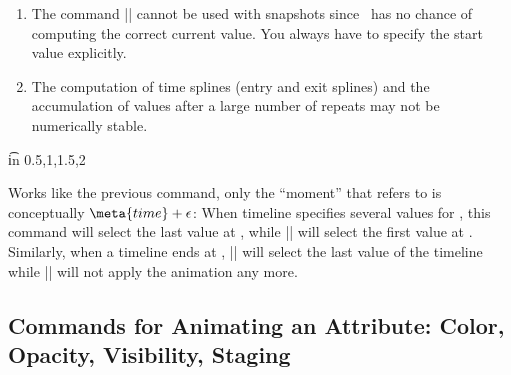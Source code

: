 \begin{command}{\pgfsysanimsnapshot{}}
\begin{enumerate}
            However, there is one command which helps you with ``simulating''
            the effect of events:
            \begin{command}{\pgfsysanimkeysnapshotstart{}}
                This command specifies that for the current animation the
                ``moment |0s|'' of the timeline is at . Thus,
                it works like |\pgfsysanimkeyoffset|, only the offset is now
                solely for the snapshot timeline. It has no effect on the
                actual animation.
            \end{command}
        \item The command |\pgfsysanimvalcurrent| cannot be used with snapshots
            since \pgfname\ has no chance of computing the correct current
            value. You always have to specify the start value explicitly.
        \item The computation of time splines (entry and exit splines) and the
            accumulation of values after a large number of repeats may not be
            numerically stable.
    \end{enumerate}
\begin{codeexample}[imagesource={standalone/pgfmanual-en-pgfsys-animations-animation-2.svg}]
\foreach \t in {0.5,1,1.5,2} {
  \pgfsysanimsnapshot{\t}
}
\end{codeexample}
\end{command}

\begin{command}{\pgfsysanimsnapshotafter{}}
    Works like the previous command, only the ``moment'' that 
    refers to is conceptually $\meta{time} + \epsilon$: When timeline specifies
    several values for , this command will select the last value at
    , while |\pgfsnapshot| will select the first value at
    . Similarly, when a timeline ends at , |\pgfsnapshot|
    will select the last value of the timeline while |\pgfsnapshotafter| will
    not apply the animation any more.
\end{command}


\subsection{Commands for Animating an Attribute: Color, Opacity, Visibility, Staging}

